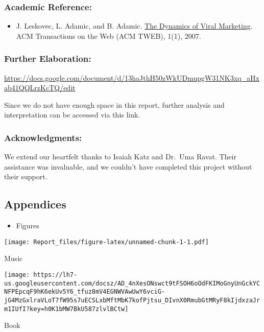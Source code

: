 \documentclass[
]{article}
\providecommand{\tightlist}{%
  \setlength{\itemsep}{0pt}\setlength{\parskip}{0pt}}
\begin{document}
\subsubsection{Academic Reference:}\label{academic-reference}

\begin{itemize}
\tightlist
\item
  J. Leskovec, L. Adamic, and B. Adamic.
  \href{https://doi.org/10.1145/1232722.1232727}{The Dynamics of Viral
  Marketing}. ACM Transactions on the Web (ACM TWEB), 1(1), 2007.
\end{itemize}

\subsubsection{Further Elaboration:}\label{further-elaboration}

\url{https://docs.google.com/document/d/13haJthH50zWkUDmupgW31NK3xq_aHxab41QQLrzKcTQ/edit}

Since we do not have enough space in this report, further analysis and
interpretation can be accessed via this link.

\subsubsection{Acknowledgments:}\label{acknowledgments}

We extend our heartfelt thanks to Isaiah Katz and Dr.~Uma Ravat. Their
assistance was invaluable, and we couldn't have completed this project
without their support.

\subsection{Appendices}\label{appendices}

\begin{itemize}
\tightlist
\item
  Figures
\end{itemize}

\texttt{[image: Report\_files/figure-latex/unnamed-chunk-1-1.pdf]}

Music

\texttt{[image: https://lh7-us.googleusercontent.com/docsz/AD\_4nXesONswct9tFSOH6oOdFKIMoGnyUnGckYCNFPEpcqF9hK6ekUv5Y6\_tfuz8mV4EGNWVAwUwY6vciG-jG4MzGxlraVLoT7fW95s7uECSLxbMftMbK7kofPjtsu\_DIvnX0RmubGtMRyF8kIjdxzaJrm1IUfI?key=h0K1bMW7BkU587zlvlBCtw]}

Book
\end{document}
